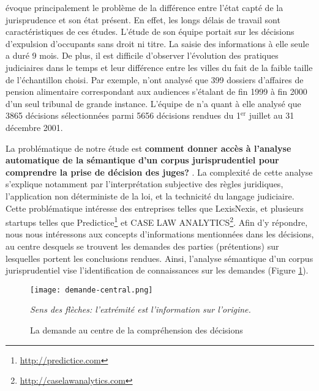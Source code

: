 \citet{ancel2003expulsion} évoque principalement le problème de la différence entre l'état capté de la jurisprudence et son état présent. En effet, les longs délais de travail sont caractéristiques de ces études. L'étude de son équipe portait sur les décisions d'expulsion d'occupants sans droit ni titre. La saisie des informations à elle seule a duré 9 mois.  De plus, il est difficile d'observer l'évolution des pratiques judiciaires dans le temps et leur différence entre les villes du fait de la faible taille de l'échantillon choisi. Par exemple, \citet{jeandidier2006pensions} n'ont analysé que 399 dossiers d'affaires de pension alimentaire correspondant aux audiences s'étalant de fin 1999 à fin 2000 d'un seul tribunal de grande instance. L'équipe de \citet{ancel2003expulsion} n'a quant à elle analysé que 3865 décisions sélectionnées parmi 5656 décisions rendues du 1$^\text{er}$  juillet au 31 décembre 2001. 
 
La problématique de notre étude est \og \textbf{comment donner accès à l'analyse automatique de la sémantique d'un corpus jurisprudentiel pour comprendre la prise de décision des juges?} \fg{}. La complexité de cette analyse s'explique notamment par l'interprétation subjective des règles juridiques, l'application non déterministe de la loi, et la technicité du langage judiciaire. Cette problématique intéresse des entreprises telles que LexisNexis, et plusieurs startups  telles que Predictice\footnote{\url{http://predictice.com}} et CASE LAW ANALYTICS\footnote{\url{http://caselawanalytics.com}}. Afin d'y répondre, nous nous intéressons aux concepts d'informations mentionnées dans les décisions, au centre desquels se trouvent les demandes des parties (prétentions) sur lesquelles portent les conclusions rendues. Ainsi, l'analyse sémantique d'un corpus jurisprudentiel vise l'identification de connaissances sur les demandes (Figure \ref{fig:intro:demande-central}).
 \begin{figure}[!htb]
 	\centering
 	\texttt{[image: demande-central.png]}
 	
 	\scriptsize{\textit{Sens des flèches: l'extrémité est l'information sur l'origine.}}
 	\caption{La demande au centre de la compréhension des décisions}
 	\label{fig:intro:demande-central}
 \end{figure} 

